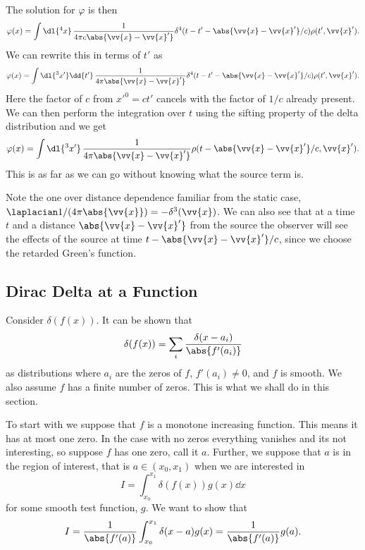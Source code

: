 \documentclass[fleqn]{NotesClass}
\begin{document}
    The solution for \(\varphi\) is then
    \begin{equation}
        \varphi(x) = \int \dl{^4x} \, \frac{1}{4\pi c\abs{\vv{x} - \vv{x}'}} \delta^4(t - t' - \abs{\vv{x} - \vv{x}'}/c) \rho(t', \vv{x}').
    \end{equation}
    We can rewrite this in terms of \(t'\) as
    \begin{equation}
        \varphi(x) = \int \dl{^3x'} \dd{t'} \, \frac{1}{4\pi \abs{\vv{x} - \vv{x}'}} \delta^4(t - t' - \abs{\vv{x} - \vv{x}'}/c) \rho(t', \vv{x}').
    \end{equation}
    Here the factor of \(c\) from \({x'}^0 = ct'\) cancels with the factor of \(1/c\) already present.
    We can then perform the integration over \(t\) using the sifting property of the delta distribution and we get
    \begin{equation}
        \varphi(x) = \int \dl{^3x'} \, \frac{1}{4\pi \abs{\vv{x} - \vv{x}'}} \rho(t  - \abs{\vv{x} - \vv{x}'}/c, \vv{x}').
    \end{equation}
    This is as far as we can go without knowing what the source term is.
    
    Note the one over distance dependence familiar from the static case, \(\laplacian 1/(4\pi\abs{\vv{x}}) = -\delta^3(\vv{x})\).
    We can also see that at a time \(t\) and a distance \(\abs{\vv{x} - \vv{x}'}\) from the source the observer will see the effects of the source at time \(t - \abs{\vv{x} - \vv{x}'}/c\), since we choose the retarded Green's function.
    
    \subsection{Dirac Delta at a Function}
    Consider \(\delta(f(x))\).
    It can be shown that
    \begin{equation}
        \delta(f(x)) = \sum_{i} \frac{\delta(x - a_i)}{\abs{f'(a_i)}}
    \end{equation}
    as distributions where \(a_i\) are the zeros of \(f\), \(f'(a_i) \ne 0\), and \(f\) is smooth.
    We also assume \(f\) has a finite number of zeros.
    This is what we shall do in this section.
    
    To start with we suppose that \(f\) is a monotone increasing function.
    This means it has at most one zero.
    In the case with no zeros everything vanishes and its not interesting, so suppose \(f\) has one zero, call it \(a\).
    Further, we suppose that \(a\) is in the region of interest, that is \(a \in (x_0, x_1)\) when we are interested in
    \begin{equation}
        I = \int_{x_0}^{x_1} \delta(f(x)) g(x) \dd{x}
    \end{equation}
    for some smooth test function, \(g\).
    We want to show that
    \begin{equation}
        I = \frac{1}{\abs{f'(a)}} \int_{x_0}^{x_1} \delta(x - a) g(x) = \frac{1}{\abs{f'(a)}} g(a).
    \end{equation}
    
\end{document}

